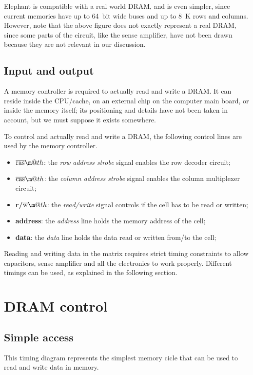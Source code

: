 \documentclass[a4paper,12pt]{article}
\makeatletter
\newcommand*{\textoverline}[1]{$\overline{\hbox{#1}}\m@th$}
\newcommand{\memoryname}{Elephant}
\makeatother
\begin{document}
\memoryname{} is compatible with a real world DRAM, and is even simpler, since current memories have up to 64~bit wide buses and up to 8~K rows and columns.
\\
However, note that the above figure does not exactly represent a real DRAM, since some parts of the circuit, like the sense amplifier, have not been drawn because they are not relevant in our discussion.

\subsection{Input and output}
A memory controller is required to actually read and write a DRAM.
It can reside inside the CPU/cache, on an external chip on the computer main board, or inside the memory itself; its positioning and details have not been taken in account, but we must suppose it exists somewhere.

To control and actually read and write a DRAM, the following control lines are used by the memory controller.

\begin{itemize}
  \item \textbf{\textoverline{ras}}: the \emph{row address strobe} signal enables the row decoder circuit;
  \item \textbf{\textoverline{cas}}: the \emph{column address strobe} signal enables the column multiplexer circuit;
  \item \textbf{r/\textoverline{w}}: the \emph{read/write} signal controls if the cell has to be read or written;
  \item \textbf{address}: the \emph{address} line holds the memory address of the cell;
  \item \textbf{data}: the \emph{data} line holds the data read or written from/to the cell;
\end{itemize}

Reading and writing data in the matrix requires strict timing constraints to allow capacitors, sense amplifier and all the electronics to work properly.
Different timings can be used, as explained in the following section.

\section{DRAM control}

\subsection{Simple access} \label{sec:simple-access}
This timing diagram represents the simplest memory cicle that can be used to read and write data in memory.
\end{document}

